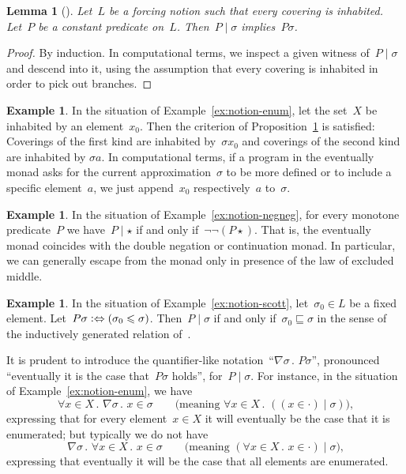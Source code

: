 \documentclass[com,11pt,crcready]{iosart2x}
\theoremstyle{definition}
\newtheorem{example}[definition]{Example}
\theoremstyle{plain}
\newtheorem{lemma}[definition]{Lemma}
\theoremstyle{remark}
\newcommand{\?}{\,{:}\,}
\renewcommand{\_}{\mathpunct{.}\,}
\begin{document}
\begin{lemma}[{\cite[Proposition~V.3.2]{joyal-tierney:grothendieck}}]\label{prop:cov-open}
Let~$L$ be a forcing notion such that every covering is inhabited. Let~$P$ be a
constant predicate on~$L$. Then~$P \mid \sigma$ implies~$P\sigma$.
\end{lemma}

\begin{proof}By induction. In computational terms, we inspect a given witness
of~$P \mid \sigma$ and descend into it, using the assumption that every
covering is inhabited in order to pick out branches.
\end{proof}

\begin{example}In the situation of Example~\ref{ex:notion-enum}, let the
set~$X$ be inhabited by an element~$x_0$. Then the criterion of
Proposition~\ref{prop:cov-open} is satisfied: Coverings of the first kind are
inhabited by~$\sigma x_0$ and coverings of the second kind are inhabited
by $\sigma a$. In computational terms, if a program in the eventually
monad asks for the current approximation~$\sigma$ to be more defined or to include a
specific element~$a$, we just append~$x_0$ respectively~$a$ to~$\sigma$.
\end{example}

\begin{example}In the situation of Example~\ref{ex:notion-negneg}, for every
monotone predicate~$P$ we have~$P \mid \star$ if and only if~$\neg\neg
(P\star)$. That is, the eventually monad coincides with the double negation or
continuation monad. In particular, we can generally escape from the monad only
in presence of the law of excluded middle.\end{example}

\begin{example}In the situation of Example~\ref{ex:notion-scott},
let~$\sigma_0 \in L$ be a fixed element. Let~$P\sigma
\vcentcolon\Leftrightarrow (\sigma_0 \leq \sigma)$. Then~$P \mid \sigma$ if
and only if~$\sigma_0 \sqsubseteq \sigma$ in the sense of the inductively
generated relation of~\cite[Definition~18]{wessel-schuster:radical}.\end{example}

It is prudent to introduce the quantifier-like notation~``$\nabla \sigma\_
P\sigma$'', pronounced ``eventually it is the case that~$P\sigma$ holds'',
for~$P \mid \sigma$. For instance, in the situation of
Example~\ref{ex:notion-enum}, we have
\[ \forall x \in X\_ \nabla \sigma\_ x \in \sigma
\qquad\text{(meaning $\forall x \in X\_ ((x \in \cdot) \mid \sigma)$),} \]
expressing that for every element~$x \in X$ it will eventually be the case that
it is enumerated; but typically we do not have
\[ \nabla \sigma\_ \forall x \in X\_ x \in \sigma
\qquad\text{(meaning $(\forall x \in X\_ x \in \cdot) \mid \sigma$),} \]
expressing that eventually it will be the case that all elements are
enumerated.
\end{document}
